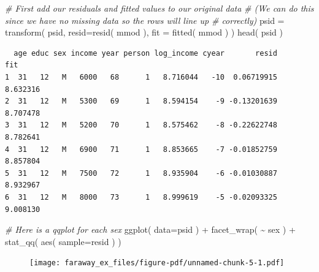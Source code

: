 \documentclass[
  letterpaper,
  DIV=11,
  numbers=noendperiod]{scrreprt}
\newenvironment{Shaded}{\begin{snugshade}}{\end{snugshade}}
\newcommand{\AttributeTok}[1]{\textcolor[rgb]{0.49,0.56,0.16}{#1}}
\newcommand{\CommentTok}[1]{\textcolor[rgb]{0.38,0.63,0.69}{\textit{#1}}}
\newcommand{\FunctionTok}[1]{\textcolor[rgb]{0.02,0.16,0.49}{#1}}
\newcommand{\NormalTok}[1]{\textcolor[rgb]{0.00,0.44,0.13}{#1}}
\newcommand{\OtherTok}[1]{\textcolor[rgb]{0.00,0.44,0.13}{#1}}
\newcommand{\SpecialCharTok}[1]{\textcolor[rgb]{0.25,0.44,0.63}{#1}}
\begin{document}
\begin{Shaded}
\begin{Highlighting}[]
\CommentTok{\# First add our residuals and fitted values to our original data}
\CommentTok{\# (We can do this since we have no missing data so the rows will line up}
\CommentTok{\# correctly)}
\NormalTok{psid }\OtherTok{=} \FunctionTok{transform}\NormalTok{( psid,  }\AttributeTok{resid=}\FunctionTok{resid}\NormalTok{( mmod ),}
                  \AttributeTok{fit =} \FunctionTok{fitted}\NormalTok{( mmod ) )}
\FunctionTok{head}\NormalTok{( psid )}
\end{Highlighting}
\end{Shaded}

\begin{verbatim}
  age educ sex income year person log_income cyear       resid      fit
1  31   12   M   6000   68      1   8.716044   -10  0.06719915 8.632316
2  31   12   M   5300   69      1   8.594154    -9 -0.13201639 8.707478
3  31   12   M   5200   70      1   8.575462    -8 -0.22622748 8.782641
4  31   12   M   6900   71      1   8.853665    -7 -0.01852759 8.857804
5  31   12   M   7500   72      1   8.935904    -6 -0.01030887 8.932967
6  31   12   M   8000   73      1   8.999619    -5 -0.02093325 9.008130
\end{verbatim}

\begin{Shaded}
\begin{Highlighting}[]
\CommentTok{\# Here is a qqplot for each sex}
\FunctionTok{ggplot}\NormalTok{( }\AttributeTok{data=}\NormalTok{psid ) }\SpecialCharTok{+}
    \FunctionTok{facet\_wrap}\NormalTok{( }\SpecialCharTok{\textasciitilde{}}\NormalTok{ sex ) }\SpecialCharTok{+}
    \FunctionTok{stat\_qq}\NormalTok{( }\FunctionTok{aes}\NormalTok{( }\AttributeTok{sample=}\NormalTok{resid ) )}
\end{Highlighting}
\end{Shaded}

\begin{figure}[H]

{\centering \texttt{[image: faraway\_ex\_files/figure-pdf/unnamed-chunk-5-1.pdf]}

}

\end{figure}
\end{document}
